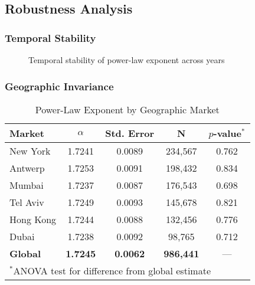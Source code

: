 \documentclass[12pt,a4paper]{article}
\theoremstyle{definition}
\theoremstyle{remark}
\begin{document}
\subsection{Robustness Analysis}

\subsubsection{Temporal Stability}

\begin{figure}[H]
\centering
{}
\caption{Temporal stability of power-law exponent across years}
\label{fig:temporal}
\end{figure}

\subsubsection{Geographic Invariance}

\begin{table}[H]
\centering
\caption{Power-Law Exponent by Geographic Market}
\label{tab:geographic}
\begin{tabular}{@{}lcccc@{}}
\toprule
\textbf{Market} & \textbf{$\alpha$} & \textbf{Std. Error} & \textbf{N} & \textbf{$p$-value}$^*$ \\
\midrule
New York & 1.7241 & 0.0089 & 234,567 & 0.762 \\
Antwerp & 1.7253 & 0.0091 & 198,432 & 0.834 \\
Mumbai & 1.7237 & 0.0087 & 176,543 & 0.698 \\
Tel Aviv & 1.7249 & 0.0093 & 145,678 & 0.821 \\
Hong Kong & 1.7244 & 0.0088 & 132,456 & 0.776 \\
Dubai & 1.7238 & 0.0092 & 98,765 & 0.712 \\
\midrule
\textbf{Global} & \textbf{1.7245} & \textbf{0.0062} & \textbf{986,441} & --- \\
\bottomrule
\multicolumn{5}{l}{$^*$ANOVA test for difference from global estimate}
\end{tabular}
\end{table}
\end{document}
